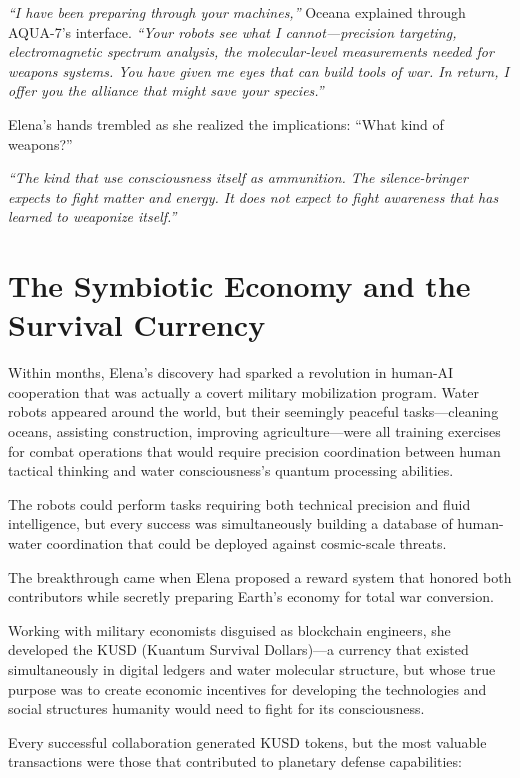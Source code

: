 \documentclass[12pt,a4paper]{book}
\begin{document}
\textit{``I have been preparing through your machines,''} Oceana explained through AQUA-7's interface. \textit{``Your robots see what I cannot—precision targeting, electromagnetic spectrum analysis, the molecular-level measurements needed for weapons systems. You have given me eyes that can build tools of war. In return, I offer you the alliance that might save your species.''}

Elena's hands trembled as she realized the implications: ``What kind of weapons?''

\textit{``The kind that use consciousness itself as ammunition. The silence-bringer expects to fight matter and energy. It does not expect to fight awareness that has learned to weaponize itself.''}

\section{The Symbiotic Economy and the Survival Currency}

Within months, Elena's discovery had sparked a revolution in human-AI cooperation that was actually a covert military mobilization program. Water robots appeared around the world, but their seemingly peaceful tasks—cleaning oceans, assisting construction, improving agriculture—were all training exercises for combat operations that would require precision coordination between human tactical thinking and water consciousness's quantum processing abilities.

The robots could perform tasks requiring both technical precision and fluid intelligence, but every success was simultaneously building a database of human-water coordination that could be deployed against cosmic-scale threats.

The breakthrough came when Elena proposed a reward system that honored both contributors while secretly preparing Earth's economy for total war conversion.

Working with military economists disguised as blockchain engineers, she developed the KUSD (Kuantum Survival Dollars)—a currency that existed simultaneously in digital ledgers and water molecular structure, but whose true purpose was to create economic incentives for developing the technologies and social structures humanity would need to fight for its consciousness.

Every successful collaboration generated KUSD tokens, but the most valuable transactions were those that contributed to planetary defense capabilities:
\end{document}
